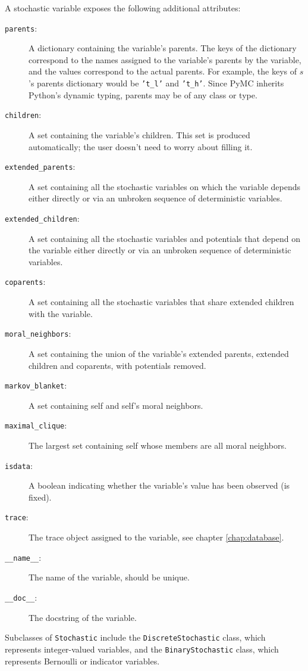 A stochastic variable exposes the following additional attributes:
\begin{description}
    \item[\texttt{parents}:] A dictionary containing the variable's parents. The keys of the dictionary correspond to the names assigned to the variable's parents by the variable, and the values correspond to the actual parents. For example, the keys of $s$'s parents dictionary would be \texttt{'t_l'} and \texttt{'t_h'}. Since PyMC inherits Python's dynamic typing, parents may be of any class or type.
    \item[\texttt{children}:] A set containing the variable's children. This set is produced automatically; the user doesn't need to worry about filling it.
    \item[\texttt{extended_parents}:] A set containing all the stochastic variables on which the variable depends either directly or via an unbroken sequence of deterministic variables.
    \item[\texttt{extended_children}:] A set containing all the stochastic variables and potentials that depend on the variable either directly or via an unbroken sequence of deterministic variables.
    \item[\texttt{coparents}:] A set containing all the stochastic variables that share extended children with the variable.
    \item[\texttt{moral_neighbors}:] A set containing the union of the variable's extended parents, extended children and coparents, with potentials removed.
    \item[\texttt{markov_blanket}:] A set containing self and self's moral neighbors.
    \item[\texttt{maximal_clique}:] The largest set containing self whose members are all moral neighbors.
    \item[\texttt{isdata}:] A boolean indicating whether the variable's value has been observed (is fixed).
    \item[\texttt{trace}:] The trace object assigned to the variable, see chapter \ref{chap:database}.
    \item[\texttt{__name__}:] The name of the variable, should be unique.
    \item[\texttt{__doc__}:] The docstring of the variable.
\end{description}

Subclasses of \texttt{Stochastic} include the \texttt{DiscreteStochastic} class, which represents integer-valued variables, and the \texttt{BinaryStochastic} class, which represents Bernoulli or indicator variables. 

